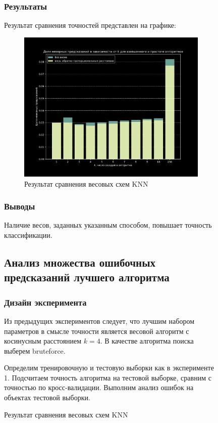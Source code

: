 \documentclass{article}
\begin{document}
\begin{figure}[H]
        \subsubsection{Результаты}
                Результат сравнения точностей представлен на графике:
                \begin{figure}[H]
                    \centering
                    \includegraphics[width=0.8\linewidth]{./pictures/Weights.pdf}
                    \caption{Результат сравнения весовых схем KNN}
                    \label{fig:mpr}
                \end{figure}

        \subsubsection{Выводы}
                Наличие весов, заданных указанным способом, повышает точность классификации.

        \subsection{Анализ множества ошибочных предсказаний лучшего алгоритма}
            \subsubsection{Дизайн эксперимента}
                Из предыдущих экспериментов следует, что лучшим набором параметров в смысле точности является весовой алгоритм с косинусным расстоянием $k=4$.
                В качестве алгоритма поиска выберем bruteforce.

                Определим тренировочную и тестовую выборки как в эксперименте 1.
                Подсчитаем точность алгоритма на тестовой выборке, сравним с точностью по кросс-валидации. Выполним анализ ошибок на объектах тестовой выборки.

\end{figure}
\end{document}
